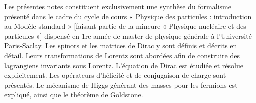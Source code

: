 Les présentes notes constituent exclusivement une synthèse du formalisme présenté dans
le cadre du cycle de cours « Physique des particules : introduction au Modèle standard »
[faisant partie de la mineure « Physique nucléaire et des particules »] dispensé en 1re
année de master de physique générale à l’Université Paris-Saclay. Les spinors et les matrices
de Dirac y sont définis et décrits en détail. Leurs transformations de Lorentz sont abordées
afin de construire des lagrangiens invariants sous Lorentz. L’équation de Dirac est étudiée
et résolue explicitement. Les opérateurs d’hélicité et de conjugaison de charge sont
présentés. Le mécanisme de Higgs générant des masses pour les fermions est expliqué,
ainsi que le théorème de Goldstone.
